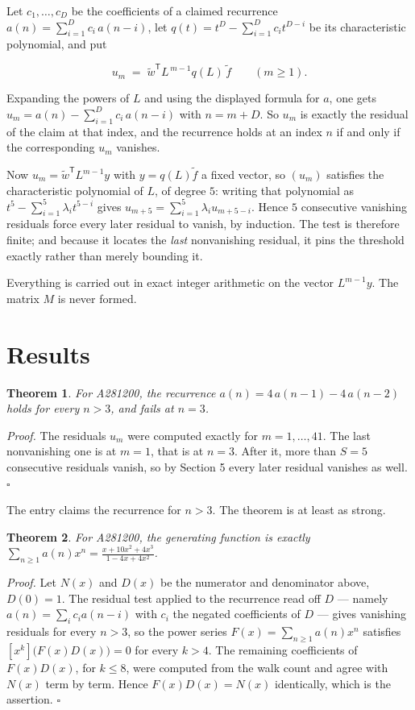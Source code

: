 \documentclass[11pt]{article}
\newtheorem{theorem}{Theorem}
\theoremstyle{definition}
\begin{document}
Let $c_1,\dots,c_D$ be the coefficients of a claimed recurrence $a(n) = \sum_{i=1}^{D} c_i\,a(n-i)$, let $q(t) = t^{D} - \sum_{i=1}^{D} c_i t^{D-i}$ be its characteristic polynomial, and put

\[u_m \;=\; \tilde w^{\mathsf T} L^{\,m-1} q(L)\,\tilde f \qquad (m \ge 1).\]

Expanding the powers of $L$ and using the displayed formula for $a$, one gets $u_m = a(n) - \sum_{i=1}^{D} c_i\,a(n-i)$ with $n = m + D$. So $u_m$ is exactly the residual of the claim at that index, and the recurrence holds at an index $n$ if and only if the corresponding $u_m$ vanishes.

Now $u_m = \tilde w^{\mathsf T} L^{m-1} y$ with $y = q(L)\tilde f$ a fixed vector, so $(u_m)$ satisfies the characteristic polynomial of $L$, of degree $5$: writing that polynomial as $t^{5} - \sum_{i=1}^{5} \lambda_i t^{5-i}$ gives $u_{m+5} = \sum_{i=1}^{5} \lambda_i u_{m+5-i}$. Hence $5$ consecutive vanishing residuals force every later residual to vanish, by induction. The test is therefore finite; and because it locates the {\itshape last} nonvanishing residual, it pins the threshold exactly rather than merely bounding it.

Everything is carried out in exact integer arithmetic on the vector $L^{m-1}y$. The matrix $M$ is never formed.

\section{Results}

\begin{theorem} For A281200, the recurrence $a(n) = 4\,a(n-1) - 4\,a(n-2)$ holds for every $n > 3$, and fails at $n = 3$.\end{theorem}

{\itshape Proof.} The residuals $u_m$ were computed exactly for $m = 1,\dots,41$. The last nonvanishing one is at $m = 1$, that is at $n = 3$. After it, more than $S = 5$ consecutive residuals vanish, so by Section 5 every later residual vanishes as well. $\square$

The entry claims the recurrence for $n > 3$. The theorem is at least as strong.

\begin{theorem} For A281200, the generating function is exactly $\sum_{n\ge 1} a(n)x^n = \frac{x + 10x^{2} + 4x^{3}}{1 - 4x + 4x^{2}}$.\end{theorem}

{\itshape Proof.} Let $N(x)$ and $D(x)$ be the numerator and denominator above, $D(0)=1$. The residual test applied to the recurrence read off $D$ --- namely $a(n) = \sum_i c_i a(n-i)$ with $c_i$ the negated coefficients of $D$ --- gives vanishing residuals for every $n > 3$, so the power series $F(x)=\sum_{n\ge 1}a(n)x^n$ satisfies $[x^k]\bigl(F(x)D(x)\bigr) = 0$ for every $k > 4$. The remaining coefficients of $F(x)D(x)$, for $k \le 8$, were computed from the walk count and agree with $N(x)$ term by term. Hence $F(x)D(x) = N(x)$ identically, which is the assertion. $\square$
\end{document}
